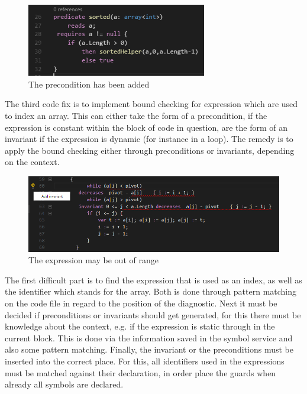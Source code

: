 \begin{figure}[H]
	\centering
	\includegraphics[width=0.7\textwidth]{img/nullCheckApplied}
	\caption{The precondition has been added}
	\label{fig:nullcheckapplied}
\end{figure}
The third code fix is to implement bound checking for expression which are used to index an array. This can either take the form of a precondition, if the expression is constant within the block of code in question, are the form of an invariant if the expression is dynamic (for instance in a loop).
The remedy is to apply the bound checking either through preconditions or invariants, depending on the context.
\begin{figure}[H]
	\centering
	\includegraphics[width=1\textwidth]{img/indexOutRangeDiag}
	\caption{The expression may be out of range}
	\label{fig:indexOutOfRange}
\end{figure}
The first difficult part is to find the expression that is used as an index, as well as the identifier which stands for the array. Both is done through pattern matching on the code file in regard to the position of the diagnostic. Next it must be decided if preconditions or invariants should get generated, for this there must be knowledge about the context, e.g. if the expression is static through in the current block. This is done via the information saved in the symbol service and also some pattern matching. \newline
Finally, the invariant or the preconditions must be inserted into the correct place. For this, all identifiers used in the expressions must be matched against their declaration, in order place the guards when already all symbols are declared. \newline
